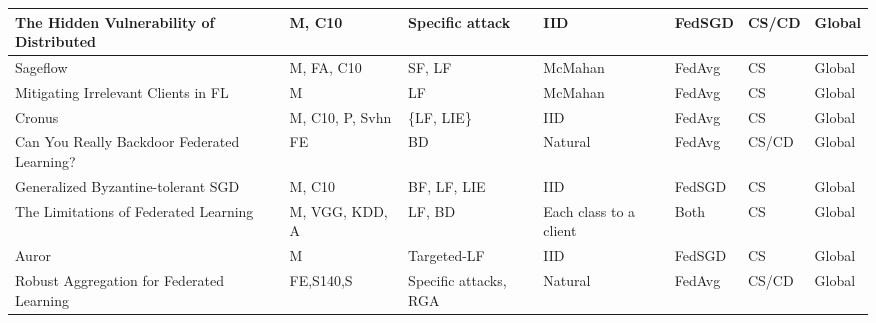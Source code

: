 \begin{table*}[]
\begin{tabular}{|l|p{2cm}|p{2.7cm}|l|p{1.5cm}|p{.7cm}|l|}
The Hidden Vulnerability of Distributed~\cite{mhamdi2018the}         & M, C10               & Specific attack                  & IID                        & FedSGD                & CS/CD            & Global              \\ \hline
Sageflow~\cite{park2021sageflow}                                        & M, FA, C10           & SF, LF                           & McMahan                    & FedAvg                & CS               & Global              \\ \hline
Mitigating Irrelevant Clients in FL~\cite{nagalapatti2021game}             & M                    & LF                               & McMahan                    & FedAvg                & CS               & Global              \\ \hline
Cronus~\cite{chang2019cronus}                                          & M, C10, P, Svhn      & \{LF, LIE\}                      & IID                        & FedAvg                & CS               & Global              \\ \hline
Can You Really Backdoor Federated Learning?~\cite{sun2019can}     & FE                   & BD                               & Natural                    & FedAvg                & CS/CD            & Global              \\ \hline
Generalized Byzantine-tolerant SGD~\cite{xie2018generalized}              & M, C10               & BF, LF, LIE                      & IID                        & FedSGD                & CS               & Global              \\ \hline
The Limitations of Federated Learning~\cite{fung2020limitations}           & M, VGG, KDD, A       & LF, BD                           & Each class to a client     & Both                  & CS               & Global              \\ \hline
Auror~\cite{shen2016auror}                                           & M                    & Targeted-LF                      & IID                        & FedSGD                & CS               & Global              \\ \hline
Robust Aggregation for Federated Learning~\cite{pillutla2019robust}       & FE,S140,S            & Specific attacks, RGA            & Natural                    & FedAvg                & CS/CD            & Global              \\ \hline

\end{tabular}
\end{table*}
